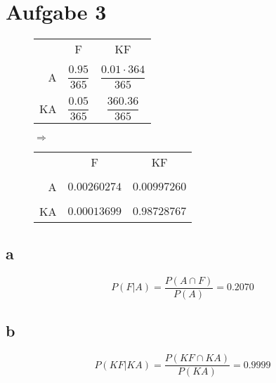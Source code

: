 
\section{Aufgabe 3}
\begin{figure}[h!]
\begin{minipage}{0.4\textwidth}
\begin{tabular}{rcc}
    &F                      &KF                             \\\\
A   &$\dfrac{0.95}{365}$    &$\dfrac{0.01 \cdot 364}{365}$  \\\\
KA  &$\dfrac{0.05}{365}$    &$\dfrac{360.36}{365}$          
\end{tabular}
\end{minipage}
\begin{minipage}{0.1\textwidth}
	\Huge$\Rightarrow$\normalsize
\end{minipage}
\begin{minipage}{0.4\textwidth}
\begin{tabular}{rcc}
    &F              &KF             \\\\
A   &$0.00260274$   &$0.00997260$    \\\\
KA  &$0.00013699$   &$0.98728767$      
\end{tabular}
\end{minipage}
\end{figure}

\subsection{a}
\[ P(F|A) = \frac{P(A \cap F)}{P(A)} = 0.2070 \]

\subsection{b}
\[ P(KF|KA) = \frac{P(KF \cap KA)}{P(KA)} = 0.9999 \]
